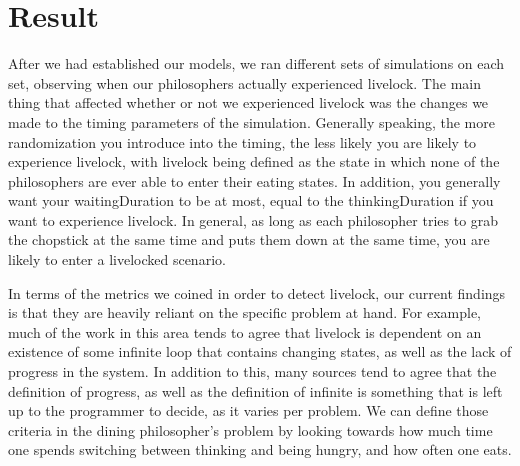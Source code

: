 \documentclass{article}
\begin{document}
\section{Result} %

After we had established our models, we ran different sets of simulations on each set, observing when our philosophers actually 
experienced livelock.  The main thing that affected whether or not we experienced livelock was the changes we made to the timing 
parameters of the simulation.  Generally speaking, the more randomization you introduce into the timing, the less likely you are 
likely to experience livelock, with livelock being defined as the state in which none of the philosophers are ever able to enter 
their eating states.  In addition, you generally want your waitingDuration to be at most, equal to the thinkingDuration if you 
want to experience livelock.  In general, as long as each philosopher tries to grab the chopstick at the same time and puts them 
down at the same time, you are likely to enter a livelocked scenario.

In terms of the metrics we coined in order to detect livelock, our current findings is that they are heavily reliant on the 
specific problem at hand.  For example, much of the work in this area tends to agree that livelock is dependent on an existence 
of some infinite loop that contains changing states, as well as the lack of progress in the system.  In addition to this, many 
sources tend to agree that the definition of progress, as well as the definition of infinite is something that is left up to the 
programmer to decide, as it varies per problem.  We can define those criteria in the dining philosopher's problem by looking towards 
how much time one spends switching between thinking and being hungry, and how often one eats.  
\end{document}
